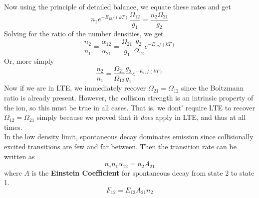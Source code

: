\documentclass[10pt]{article}
\numberwithin{equation}{section}
\newcommand{\n}{\noindent}
\begin{document}
  Now using the principle of detailed balance, we equate these rates and get 
  \begin{equation}
    \label{eq:coll:14} n_1e^{-E_{12}/(kT)}\frac{\Omega_{12}}{g_1} = \frac{n_2 \Omega_{21}}{g_2}
  \end{equation}
  Solving for the ratio of the number densities, we get
  \begin{equation}
    \label{eq:coll:15} \frac{n_2}{n_1} = \frac{\alpha_{12}}{\alpha_{21}} = \frac{\Omega_{21}}{g_1}\frac{g_2}{\Omega_{12}} e^{-E_{12}/(kT)}
  \end{equation}
  Or, more simply
  \begin{equation}
    \label{eq:coll:16} \frac{n_2}{n_1} = \frac{\Omega_{21}}{\Omega_{12}} \frac{g_2}{g_1} e^{-E_{12}/(kT)}
  \end{equation}
  Now if we are in LTE, we immediately recover $\Omega_{21} = \Omega_{12}$ since the Boltzmann ratio is already present. However, the collision strength is an intrinsic property of the ion, so this must be true in all cases. That is, we dont' require LTE to recover $\Omega_{12}=\Omega_{21}$ simply because we proved that it \emph{does} apply in LTE, and thus at all times.\\
  
\n In the low density limit, spontaneous decay dominates emission since collisionally excited transitions are few and far between. Then the transition rate can be written as
\begin{equation}
  \label{eq:einstein:1} n_en_1\alpha_{12} = n_2 A_{21}
\end{equation}
where $A$ is the \textbf{Einstein Coefficient} for spontaneous decay from state 2 to state 1. 
\begin{equation}
  \label{eq:einstein:2} F_{12} = E_{12} A_{21} n_2
\end{equation}
\end{document}
